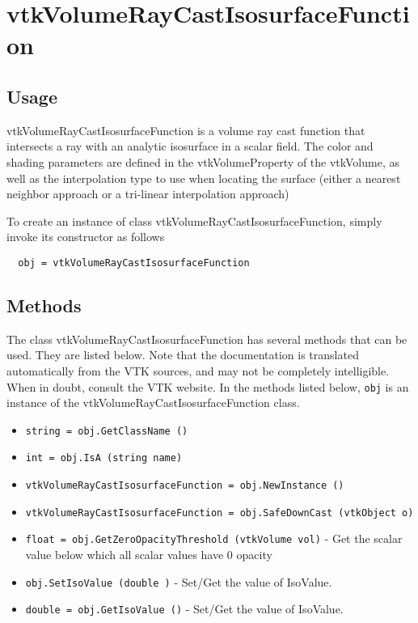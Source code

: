 \section{vtkVolumeRayCastIsosurfaceFunction}

\subsection{Usage}

 vtkVolumeRayCastIsosurfaceFunction is a volume ray cast function that
 intersects a ray with an analytic isosurface in a scalar field. The color
 and shading parameters are defined in the vtkVolumeProperty of the 
 vtkVolume, as well as the interpolation type to use when locating the
 surface (either a nearest neighbor approach or a tri-linear interpolation
 approach)


To create an instance of class vtkVolumeRayCastIsosurfaceFunction, simply
invoke its constructor as follows
\begin{verbatim}
  obj = vtkVolumeRayCastIsosurfaceFunction
\end{verbatim}
\subsection{Methods}

The class vtkVolumeRayCastIsosurfaceFunction has several methods that can be used.
  They are listed below.
Note that the documentation is translated automatically from the VTK sources,
and may not be completely intelligible.  When in doubt, consult the VTK website.
In the methods listed below, \verb|obj| is an instance of the vtkVolumeRayCastIsosurfaceFunction class.
\begin{itemize}
\item  \verb|string = obj.GetClassName ()|

\item  \verb|int = obj.IsA (string name)|

\item  \verb|vtkVolumeRayCastIsosurfaceFunction = obj.NewInstance ()|

\item  \verb|vtkVolumeRayCastIsosurfaceFunction = obj.SafeDownCast (vtkObject o)|

\item  \verb|float = obj.GetZeroOpacityThreshold (vtkVolume vol)| -  Get the scalar value below which all scalar values have 0 opacity

\item  \verb|obj.SetIsoValue (double )| -  Set/Get the value of IsoValue.

\item  \verb|double = obj.GetIsoValue ()| -  Set/Get the value of IsoValue.

\end{itemize}
